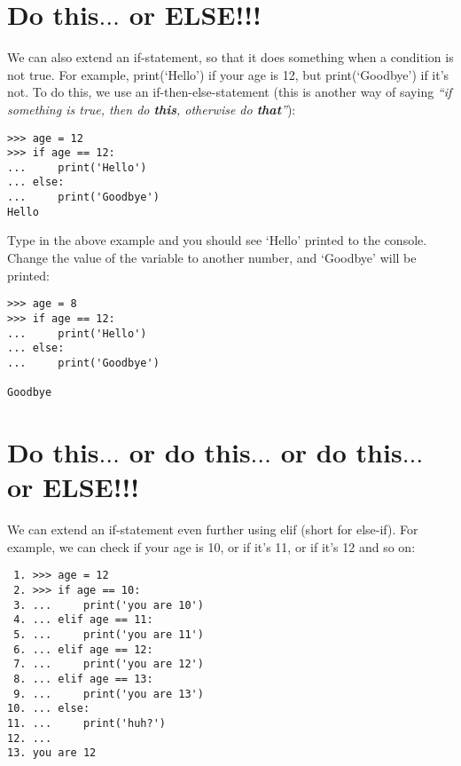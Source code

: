 \section{Do this$\ldots$ or ELSE!!!}

We can also extend an if-statement, so that it does something when a condition is not true.  For example, print(`Hello') if your age is 12, but print(`Goodbye') if it's not.  To do this, we use an if-then-else-statement (this is another way of saying \emph{``if something is true, then do \textbf{this}, otherwise do \textbf{that}''}):

\begin{listing}
\begin{verbatim}
>>> age = 12
>>> if age == 12:
...     print('Hello')
... else:
...     print('Goodbye')
Hello
\end{verbatim}
\end{listing}

Type in the above example and you should see `Hello' printed to the console.  Change the value of the variable  to another number, and `Goodbye' will be printed:

\begin{listing}
\begin{verbatim}
>>> age = 8
>>> if age == 12:
...     print('Hello')
... else:
...     print('Goodbye')

Goodbye
\end{verbatim}
\end{listing}

\section{Do this$\ldots$ or do this$\ldots$ or do this$\ldots$ or ELSE!!!}

We can extend an if-statement even further using elif (short for else-if). For example, we can check if your age is 10, or if it's 11, or if it's 12 and so on:

\begin{listing}
\begin{verbatim}
 1. >>> age = 12
 2. >>> if age == 10:
 3. ...     print('you are 10')
 4. ... elif age == 11:
 5. ...     print('you are 11')
 6. ... elif age == 12:
 7. ...     print('you are 12')
 8. ... elif age == 13:
 9. ...     print('you are 13')
10. ... else:
11. ...     print('huh?')
12. ...
13. you are 12
\end{verbatim}
\end{listing}


